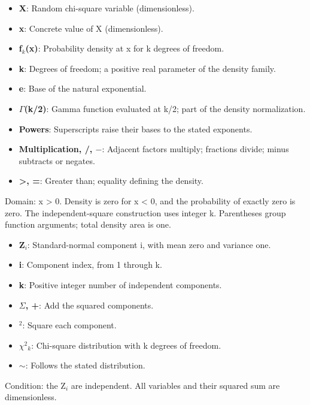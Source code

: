 \documentclass[11pt,a4paper]{article}
\begin{document}
\begin{minipage}{\linewidth}
\begin{itemize}\setlength{\itemsep}{1pt}\setlength{\parsep}{0pt}
\item \textbf{X}: Random chi-square variable (dimensionless).
\item \textbf{x}: Concrete value of X (dimensionless).
\item \textbf{f\ensuremath{{}_k}(x)}: Probability density at x for k degrees of freedom.
\item \textbf{k}: Degrees of freedom; a positive real parameter of the density family.
\item \textbf{e}: Base of the natural exponential.
\item \textbf{\ensuremath{\Gamma}(k/2)}: Gamma function evaluated at k/2; part of the density normalization.
\item \textbf{Powers}: Superscripts raise their bases to the stated exponents.
\item \textbf{Multiplication, /, \ensuremath{-}}: Adjacent factors multiply; fractions divide; minus subtracts or negates.
\item \textbf{>, =}: Greater than; equality defining the density.
\end{itemize}

Domain: x > 0. Density is zero for x < 0, and the probability of exactly zero is zero. The independent-square construction uses integer k. Parentheses group function arguments; total density area is one.

\begin{itemize}\setlength{\itemsep}{1pt}\setlength{\parsep}{0pt}
\item \textbf{Z\ensuremath{{}_i}}: Standard-normal component i, with mean zero and variance one.
\item \textbf{i}: Component index, from 1 through k.
\item \textbf{k}: Positive integer number of independent components.
\item \textbf{\ensuremath{\Sigma}, +}: Add the squared components.
\item \textbf{\ensuremath{{}^2}}: Square each component.
\item \textbf{\ensuremath{\chi}\ensuremath{{}^2}\ensuremath{{}_k}}: Chi-square distribution with k degrees of freedom.
\item \textbf{\ensuremath{\sim}}: Follows the stated distribution.
\end{itemize}

Condition: the Z\ensuremath{{}_i} are independent. All variables and their squared sum are dimensionless.

\end{minipage}\par
\medskip
\end{document}
